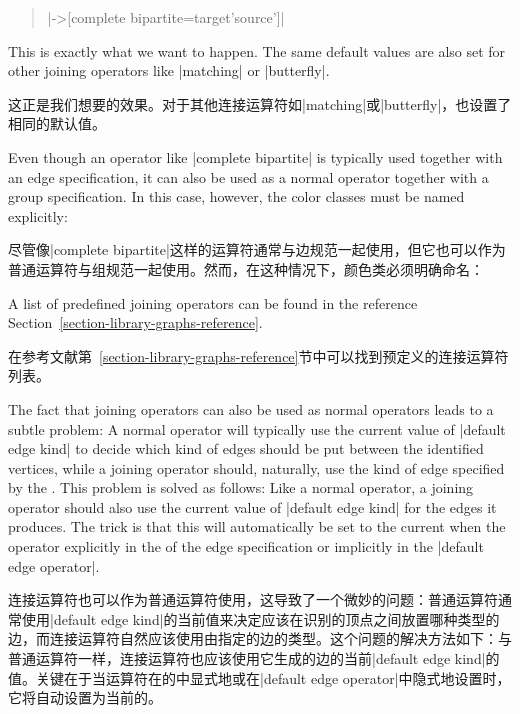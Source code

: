 %
\begin{quote}
    |->[complete bipartite={target'}{source'}]|
\end{quote}
%
This is exactly what we want to happen. The same default values are also set
for other joining operators like |matching| or |butterfly|.

这正是我们想要的效果。对于其他连接运算符如|matching|或|butterfly|，也设置了相同的默认值。

Even though an operator like |complete bipartite| is typically used together
with an edge specification, it can also be used as a normal operator together
with a group specification. In this case, however, the color classes must be
named explicitly:

尽管像|complete bipartite|这样的运算符通常与边规范一起使用，但它也可以作为普通运算符与组规范一起使用。然而，在这种情况下，颜色类必须明确命名：

%
\begin{codeexample}[preamble={\usetikzlibrary{graphs}}]
\end{codeexample}

A list of predefined joining operators can be found in the reference
Section~\ref{section-library-graphs-reference}.

在参考文献第~\ref{section-library-graphs-reference}节中可以找到预定义的连接运算符列表。

The fact that joining operators can also be used as normal operators leads to a
subtle problem: A normal operator will typically use the current value of
|default edge kind| to decide which kind of edges should be put between the
identified vertices, while a joining operator should, naturally, use the kind
of edge specified by the . This problem is solved as
follows: Like a normal operator, a joining operator should also use the current
value of |default edge kind| for the edges it produces. The trick is that this
will automatically be set to the current  when the
operator explicitly in the  of the edge specification or
implicitly in the |default edge operator|.

连接运算符也可以作为普通运算符使用，这导致了一个微妙的问题：普通运算符通常使用|default edge kind|的当前值来决定应该在识别的顶点之间放置哪种类型的边，而连接运算符自然应该使用由指定的边的类型。这个问题的解决方法如下：与普通运算符一样，连接运算符也应该使用它生成的边的当前|default edge kind|的值。关键在于当运算符在的中显式地或在|default edge operator|中隐式地设置时，它将自动设置为当前的。


